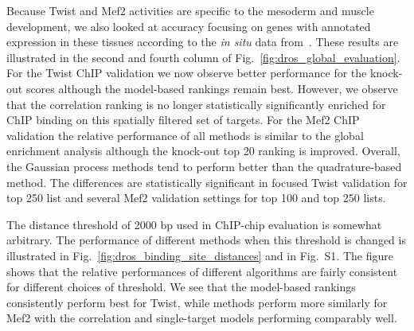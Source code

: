\documentclass{pnastwo}
\begin{document}
\begin{article}
Because Twist and Mef2 activities are specific to the mesoderm and
muscle development, we also looked at accuracy focusing on genes
with annotated expression in these tissues according to the
\emph{in situ} data from~\cite{Tomancak2002}. These results are
illustrated in the second and fourth column of
Fig.~\ref{fig:dros_global_evaluation}. For the Twist
ChIP validation we now observe better performance for the knock-out
scores although the model-based rankings remain best. However, we
observe that the correlation ranking is no longer statistically
significantly enriched for ChIP binding on this spatially filtered set
of targets. For the Mef2 ChIP validation the relative performance of
all methods is similar to the global enrichment analysis
although the knock-out top 20 ranking is improved.
Overall, the Gaussian process methods tend to perform better than the
quadrature-based method. The differences are statistically significant
in focused Twist validation for top 250 list and several Mef2 validation
settings for top 100 and top 250 lists.


The distance threshold of 2000 bp used in ChIP-chip evaluation is
somewhat arbitrary.  The performance of different methods when this
threshold is changed is illustrated in
Fig.~\ref{fig:dros_binding_site_distances} and in Fig.~S1.
The figure shows that the relative performances of
different algorithms are fairly consistent for different choices of threshold. 
We see that the model-based rankings consistently perform best for Twist, while 
methods perform more similarly for Mef2 with the correlation and single-target models 
performing comparably well.




\end{article}
\end{document}
